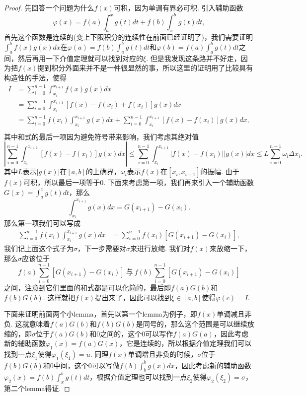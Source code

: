 \documentclass{article}
\begin{document}
\begin{proof}
{\color{blue}先回答一个问题为什么$f(x)$可积}，因为单调有界必可积. 引入辅助函数
$$
\varphi(x) = f(a)\int_a^x g(t)dt + f(b)\int_x^b g(t)dt,
$$
首先这个函数是连续的(变上下限积分的连续性在前面已经证明了)，我们需要证明
$\int_a^b f(x)g(x)dx$在$\varphi(a) = f(b)\int_a^b g(t)dt$和$\varphi(b) = f(a) \int_a^b g(t)dt$之间，然后再用一下介值定理就可以找到对应的$\xi$. 但是我发现这条路并不好走，因为{\color{blue}把$f(x)$提到积分外面来并不是一件很显然的事}，所以这里的证明用了比较具有构造性的手法，使得
$$
\begin{array}{ll}
I &= \sum\limits_{i=0}^{n-1}\int_{x_i}^{x_{i+1}} f(x)g(x)dx \\
&= \sum\limits_{i=0}^{n-1}\int_{x_i}^{x_{i+1}}\left[ f(x)-f(x_i)+f(x_i)\right]g(x)dx \\
&= \sum\limits_{i=0}^{n-1} f(x_i) \int_{x_i}^{x_{i+1}}g(x)dx + \sum\limits_{i=0}^{n-1}\int_{x_i}^{x_{i+1}}\left[ f(x)-f(x_i)\right]g(x)dx, \\
\end{array}
$$
其中和式的最后一项因为避免符号带来影响，我们考虑其绝对值
$$
\left|\sum\limits_{i=0}^{n-1}\int_{x_i}^{x_{i+1}}\left[ f(x)-f(x_i)\right]g(x)dx \right| \leq \sum\limits_{i=0}^{n-1}\int_{x_i}^{x_{i+1}}\left| f(x)-f(x_i)\right||g(x)|dx \leq L \sum\limits_{i=0}^{n-1} \omega_i\Delta x_i. 
$$
其中$L$表示$|g(x)|$在$[a,b]$的上确界，$\omega_i$表示$f(x)$在$[x_i,x_{i+1}]$的振幅. 由于$f(x)$可积，所以最后一项等于$0$. 下面来考虑第一项，我们再来引入一个辅助函数$G(x) = \int_a^x g(t)dt$，那么
$$
\int_{x_i}^{x_{i+1}} g(x)dx = G(x_{i+1})-G(x_{i}).
$$
那么第一项我们可以写成
$$
\begin{array}{ll}
\sum\limits_{i=0}^{n-1} f(x_i) \int_{x_i}^{x_{i+1}}g(x)dx &= \sum\limits_{i=0}^{n-1} f(x_i)\left[ G(x_{i+1})-G(x_{i})\right],
\end{array}
$$
我们记上面这个式子为$\sigma$，下一步需要对$\sigma$来进行放缩. 我们对$f(x)$来放缩一下，那么$\sigma$应该位于
$$
f(a)\sum\limits_{i=0}^{n-1} \left[ G(x_{i+1})-G(x_{i})\right]~\text{与}~f(b)\sum\limits_{i=0}^{n-1} \left[ G(x_{i+1})-G(x_{i})\right]
$$之间，注意到它们里面的和式都是可以化简的，最后即$f(a)G(b)$和$f(b)G(b)$. 这样就把$f(x)$提出来了，因此可以找到$\xi \in [a,b]$使得$\varphi(c)=I$. 

下面来证明前面两个小lemma，首先以第一个lemma为例子，即$f(x)$单调减且非负.     这就意味着$f(a)G(b)$和$f(b)G(b)$是同号的，那么这个范围是可以继续放缩的，即$\sigma$位于$f(a)G(b)$和$0$之间的，这个$0$可以写作$f(a)G(a)$，因此考虑新的辅助函数$\varphi_1(x)=f(a)G(x)$，它是连续的，所以根据介值定理我们可以找到一点$\xi_1$使得$\varphi_1(\xi_1) = u$. 同理$f(x)$单调增且非负的时候，$\sigma$位于$f(b)G(b)$和$0$中间，这个$0$可以写做$f(b)\int_b^{b} g(x)dx$，因此考虑新的辅助函数$\varphi_2(x) = f(b)\int_{x}^b g(t)dt$，根据介值定理也可以找到一点$\xi_2$使得$\varphi_2(\xi_2) = \sigma$，第二个lemma得证.
\end{proof}
\end{document}
